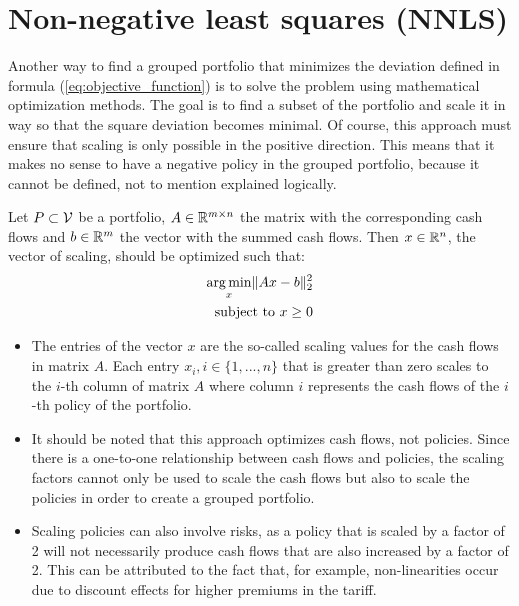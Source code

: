 

\chapter{Non-negative least squares (NNLS)}
\label{cha:NNLS}

Another way to find a grouped portfolio that minimizes the deviation defined in formula (\ref{eq:objective_function}) is to solve the problem using mathematical optimization methods. The goal is to find a subset of the portfolio and scale it in way so that the square deviation becomes minimal. Of course, this approach must ensure that scaling is only possible in the positive direction. This means that it makes no sense to have a negative policy in the grouped portfolio, because it cannot be defined, not to mention explained logically. 

\begin{definition}\label{def:NNLS}
	Let $P \subset \mathcal{V}$ be a portfolio, \linebreak $A \in \mathbb{R}^{m \times n}$ the matrix with the corresponding cash flows and $b \in \mathbb{R}^m$ the vector with the summed cash flows. Then $x \in \mathbb{R}^n$, the vector of scaling, should be optimized such that:  
	\begin{equation}\label{eq:NNLS}
		\begin{aligned}
			\operatorname*{arg\,min}_x \lVert Ax -b \rVert_2^2 \\
			\text{subject to } x \geq 0
		\end{aligned}
	\end{equation}
\end{definition}

\begin{remark}
	\leavevmode %
	\makeatletter
	\@nobreaktrue
	\makeatother
	\begin{itemize}
		\item 	The entries of the vector $x$ are the so-called scaling values for the cash flows in matrix $A$. Each entry $x_i, i \in \{1,...,n\}$ that is greater than zero scales to the $i$-th column of matrix $A$ where column $i$ represents the cash flows of the $i$-th policy of the portfolio.
		\item 	It should be noted that this approach optimizes cash flows, not policies. Since there is a one-to-one relationship between cash flows and policies, the scaling factors cannot only be used to scale the cash flows but also to scale the policies in order to create a grouped portfolio. 
		\item 	Scaling policies can also involve risks, as a policy that is scaled by a factor of 2 will not necessarily produce cash flows that are also increased by a factor of 2. This can be attributed to the fact that, for example, non-linearities occur due to discount effects for higher premiums in the tariff.
	\end{itemize}
\end{remark}

